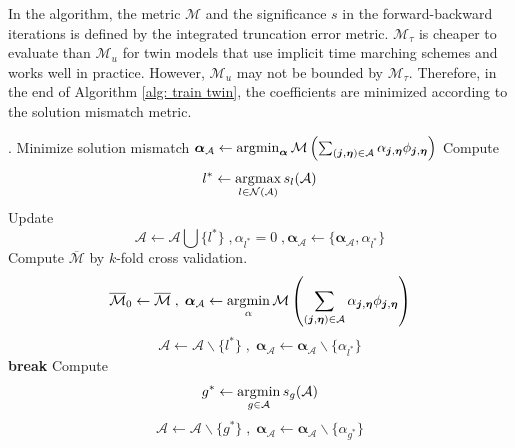 In the algorithm,
the metric $\mathcal{M}$ and the significance $s$ in the forward-backward iterations is defined by
the integrated truncation error metric.
$\mathcal{M}_{\tau}$ is cheaper to evaluate than $\mathcal{M}_u$ 
for twin models that use implicit time marching schemes and works well in practice. However, 
$\mathcal{M}_u$ may not be bounded by $\mathcal{M}_{\tau}$. Therefore, in the end of Algorithm
\ref{alg: train twin}, the coefficients are minimized according to the solution mismatch metric.



\begin{algorithm}
\begin{algorithmic}[1]
.
\STATE Minimize solution mismatch 
       $
           \boldsymbol{\alpha}_{\mathcal{A}} \leftarrow \operatorname*{\arg\!\min}_{\boldsymbol{\alpha}} 
           \mathcal{M}\left(\sum_{
           (\boldsymbol{j}, \boldsymbol{\eta}) \in \mathcal{A}} 
           \alpha_{\boldsymbol{j}, 
           \boldsymbol{\eta}} \phi_{\boldsymbol{j}, \boldsymbol{\eta}}\right)
       $ 
\LOOP 
\STATE Compute 
       $$l^* \leftarrow \operatorname*{\arg\!\max}_{l \in \mathcal{N}(\mathcal{A})} s_l(\mathcal{A})$$
\STATE Update\\
       $$\mathcal{A} \leftarrow 
       \mathcal{A} \bigcup \{l^*\}\;, \alpha_{l^*} = 0\;,
       \boldsymbol{\alpha}_{\mathcal{A}} \leftarrow \{\boldsymbol{\alpha}_{\mathcal{A}}, 
       \alpha_{l^*}\}$$
\STATE Compute $\overline{\mathcal{M}}$ by $k$-fold cross validation.
    \STATE $$
               \overline{\mathcal{M}}_0\leftarrow \overline{\mathcal{M}}\;,\;
               \boldsymbol{\alpha}_{\mathcal{A}} \leftarrow \operatorname*{\arg\!\min}_{\alpha} 
               \mathcal{M}\left(\sum_{(\boldsymbol{j}, \boldsymbol{\eta}) 
               \in \mathcal{A}} \alpha_{\boldsymbol{j}, \boldsymbol{\eta}} 
               \phi_{\boldsymbol{j}, \boldsymbol{\eta}}\right)
           $$
\ELSE \STATE 
       $$\mathcal{A} \leftarrow 
       \mathcal{A} \backslash \{l^*\}
       \;,\;\boldsymbol{\alpha}_{\mathcal{A}} \leftarrow \boldsymbol{\alpha}_{\mathcal{A}} \backslash 
       \{\alpha_{l^*}\}$$
       \textbf{break}
\ENDIF
\STATE Compute 
       $$g^* \leftarrow \operatorname*{\arg\!\min}_{g \in \mathcal{A}} s_g(\mathcal{A})$$
\STATE  
       $$\mathcal{A} \leftarrow 
       \mathcal{A} \backslash \{g^*\}\;,\;
       \boldsymbol{\alpha}_{\mathcal{A}} \leftarrow \boldsymbol{\alpha}_{\mathcal{A}}\backslash \{\alpha_{g^*}\} $$

\end{algorithmic}
\end{algorithm}
